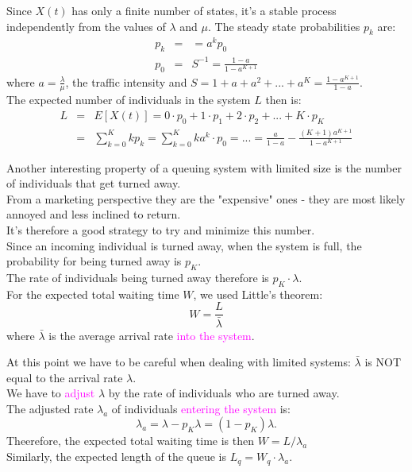 \documentclass[20pt,landscape]{foils}
\newcommand{\no}{\noindent}
\begin{document}
\no Since $X(t)$ has only a finite number of states, it's a stable process independently from the values of  $\lambda$ and $\mu$.
\foilhead[-.8in]{\textcolor{blue}{The $M/M/1/K$ queue (cont'd)}}\vspace*{.1in}
\no The steady state probabilities $p_k$ are:
\begin{eqnarray*}
p_k &=& = a^k p_0 \\
p_0 &=& S^{-1} = \frac{1 - a}{1 - a^{K+1}}
\end{eqnarray*}
\no where $a = \frac{\lambda}{\mu}$, the traffic intensity and
$S = 1 + a + a^2 + ... + a^K = \frac{1 - a^{K+1}}{1 - a}$.\\[.1in]
\no The expected number of individuals in the system $L$ then is:
\begin{eqnarray*}
L &=& E[X(t)] = 0\cdot p_0 + 1 \cdot p_1 + 2 \cdot p_2 + ... + K \cdot p_K  \\
&=& \sum_{k=0}^K k p_k = \sum_{k=0}^K k a^k \cdot p_0 = ... = \frac{a}{1-a} - \frac{(K+1) a^{K+1}}{1 - a^{K+1}} 
\end{eqnarray*}

\foilhead[-.8in]{\textcolor{blue}{The $M/M/1/K$ queue (cont'd)}}\vspace*{.1in}
\no Another interesting property of a queuing system with limited size is the number of individuals that get turned away.\\[.1in] 
\no From a marketing perspective they are the "expensive" ones - they are most likely annoyed and less inclined to return.\\[.1in]
\no  It's therefore a good strategy to try and minimize this number.\\[.1in]
\no Since an incoming individual is turned away, when the system is full, the probability for being turned away is $p_K$.\\[.1in]
\no The rate of individuals being turned away therefore is $p_K \cdot \lambda$.\\[.1in]
\no For the expected total waiting time $W$, we used Little's theorem:
\[
W = \frac{L}{\bar{\lambda}}
\]
where $\bar{\lambda}$ is the average arrival rate {\textcolor{magenta}{into the system}}.

\foilhead[-.8in]{\textcolor{blue}{The $M/M/1/K$ queue (cont'd)}}\vspace*{.2in}
\no At this point we have to be careful when dealing with limited systems: $\bar{\lambda}$ is NOT equal to the arrival rate $\lambda$.\\[.1in]
\no We have to  {\textcolor{magenta}{adjust}} $\lambda$ by the rate of individuals who are turned away.\\[.2in]
\no The adjusted rate $\lambda_a$ of individuals {\textcolor{magenta}{entering the system}} is:
\[
\lambda_a = \lambda - p_K \lambda = (1 - p_K) \lambda.
\]
\no Theerefore, the expected total waiting time is then $W = L/\lambda_a$\\[.2in]
\no Similarly, the expected length of the queue  is $L_q = W_q \cdot \lambda_a$.
\end{document}
